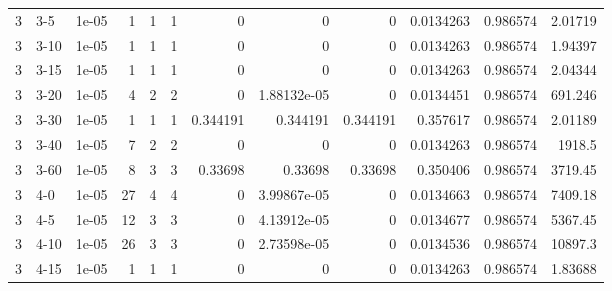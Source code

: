 \begin{tabular}{rlrrrrrrrrrr}
     3 & 3-5    &      1e-05 &           1 &                 1 &                 1 &     0           &     0           &      0           &        0.0134263 &               0.986574 &           2.01719  \\
     3 & 3-10   &      1e-05 &           1 &                 1 &                 1 &     0           &     0           &      0           &        0.0134263 &               0.986574 &           1.94397  \\
     3 & 3-15   &      1e-05 &           1 &                 1 &                 1 &     0           &     0           &      0           &        0.0134263 &               0.986574 &           2.04344  \\
     3 & 3-20   &      1e-05 &           4 &                 2 &                 2 &     0           &     1.88132e-05 &      0           &        0.0134451 &               0.986574 &         691.246    \\
     3 & 3-30   &      1e-05 &           1 &                 1 &                 1 &     0.344191    &     0.344191    &      0.344191    &        0.357617  &               0.986574 &           2.01189  \\
     3 & 3-40   &      1e-05 &           7 &                 2 &                 2 &     0           &     0           &      0           &        0.0134263 &               0.986574 &        1918.5      \\
     3 & 3-60   &      1e-05 &           8 &                 3 &                 3 &     0.33698     &     0.33698     &      0.33698     &        0.350406  &               0.986574 &        3719.45     \\
     3 & 4-0    &      1e-05 &          27 &                 4 &                 4 &     0           &     3.99867e-05 &      0           &        0.0134663 &               0.986574 &        7409.18     \\
     3 & 4-5    &      1e-05 &          12 &                 3 &                 3 &     0           &     4.13912e-05 &      0           &        0.0134677 &               0.986574 &        5367.45     \\
     3 & 4-10   &      1e-05 &          26 &                 3 &                 3 &     0           &     2.73598e-05 &      0           &        0.0134536 &               0.986574 &       10897.3      \\
     3 & 4-15   &      1e-05 &           1 &                 1 &                 1 &     0           &     0           &      0           &        0.0134263 &               0.986574 &           1.83688  \\

\end{tabular}
